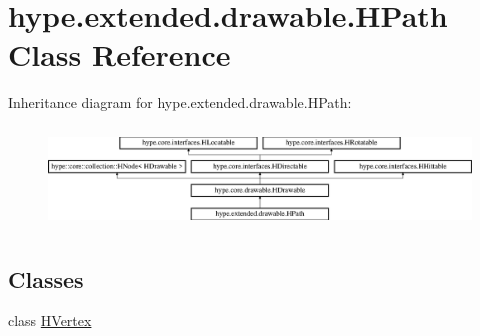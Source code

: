 \hypertarget{classhype_1_1extended_1_1drawable_1_1_h_path}{\section{hype.\-extended.\-drawable.\-H\-Path Class Reference}
\label{classhype_1_1extended_1_1drawable_1_1_h_path}
}
Inheritance diagram for hype.\-extended.\-drawable.\-H\-Path\-:\begin{figure}[H]
\begin{center}
\leavevmode
\includegraphics[height=2.745098cm]{classhype_1_1extended_1_1drawable_1_1_h_path}
\end{center}
\end{figure}
\subsection*{Classes}
\begin{DoxyCompactItemize}
\item 
class \hyperlink{classhype_1_1extended_1_1drawable_1_1_h_path_1_1_h_vertex}{H\-Vertex}
\end{DoxyCompactItemize}
